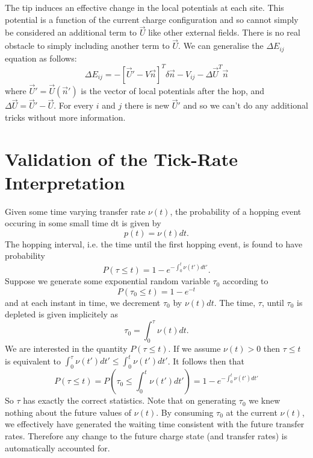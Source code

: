 \documentclass[11pt]{article}
\begin{document}
The tip induces an effective change in the local potentials at each site. This potential is a function of the current charge configuration and so cannot simply be considered an additional term to $\vec{U}$ like other external fields. There is no real obstacle to simply including another term to $\vec{U}$. We can generalise the $\Delta E_{ij}$ equation as follows:
\begin{equation}
\Delta E_{ij} = -[\vec{U}' -V\vec{n}]^T \delta \vec{n} - V_{ij} - \Delta \vec{U}^T \vec{n}
\end{equation}
where $\vec{U}' = \vec{U}(\vec{n}')$ is the vector of local potentials after the hop, and $\Delta \vec{U} = \vec{U}' - \vec{U}$. For every $i$ and $j$ there is new $\vec{U}'$ and so we can't do any additional tricks without more information.






\clearpage
\appendix

\section{Validation of the Tick-Rate Interpretation}
\label{app:tickrate}

Given some time varying transfer rate $\nu(t)$, the probability of a hopping event occuring in some small time dt is given by 
\begin{equation}
p(t) = \nu(t) dt.
\end{equation}
The hopping interval, i.e. the time until the first hopping event, is found to have probability
\begin{equation}
P(\tau \leq t) = 1-e^{-\int_0^t \nu(t')dt'}.
\end{equation}
Suppose we generate some exponential random variable $\tau_0$ according to
\begin{equation}
P(\tau_0 \leq t) = 1-e^{-t}
\end{equation}
and at each instant in time, we decrement $\tau_0$ by $\nu(t)dt$. The time, $\tau$, until $\tau_0$ is depleted is given implicitely as
\begin{equation}
\tau_0 = \int_0^\tau \nu(t) dt.
\end{equation}
We are interested in the quantity $P(\tau \leq t)$. If we assume $\nu(t)>0$ then $\tau \leq t$ is equivalent to $\int_0^\tau \nu(t') dt' \leq \int_0^t \nu(t')dt'$. It follows then that
\begin{equation}
P(\tau \leq t) = P\left( \tau_0 \leq \int_0^t \nu(t')dt' \right) = 1-e^{-\int_0^t \nu(t')dt'}
\end{equation}
So $\tau$ has exactly the correct statistics. Note that on generating $\tau_0$ we knew nothing about the future values of $\nu(t)$. By consuming $\tau_0$ at the current $\nu(t)$, we effectively have generated the waiting time consistent with the future transfer rates. Therefore any change to the future charge state (and transfer rates) is automatically accounted for.
\end{document}
